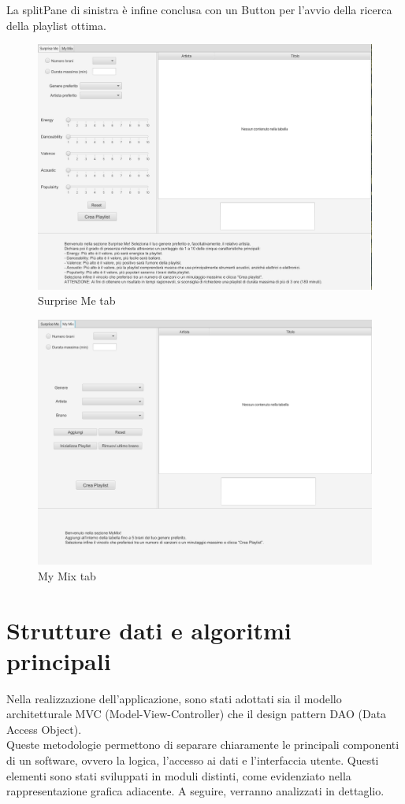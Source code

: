 \documentclass[12pt, a4paper]{article}
\begin{document}
La splitPane di sinistra è infine conclusa con un Button per l'avvio della ricerca della playlist ottima.

\newpage

\begin{figure}[ht]
\centering
  \includegraphics[clip, width=0.65\linewidth]{images/surpriseMeTotal.png}
  \caption{Surprise Me tab}
\end{figure}
  
\begin{figure}[ht]  
\centering
  \includegraphics[clip, width=0.65\linewidth]{images/myMixTotal.png}
  \caption{My Mix tab}
\end{figure}


\newpage

\section{Strutture dati e algoritmi principali}

Nella realizzazione dell'applicazione, sono stati adottati sia il modello architetturale MVC (Model-View-Controller) che il design pattern DAO (Data Access Object). \\Queste metodologie permettono di separare chiaramente le principali componenti di un software, ovvero la logica, l'accesso ai dati e l'interfaccia utente. Questi elementi sono stati sviluppati in moduli distinti, come evidenziato nella rappresentazione grafica adiacente. A seguire, verranno analizzati in dettaglio.
\end{document}
